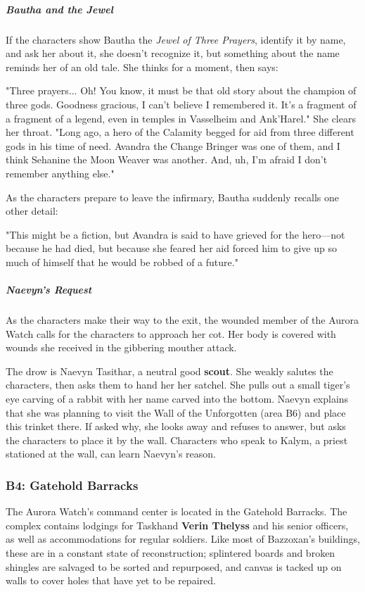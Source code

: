 \documentclass[10pt,a4paper,twoside,bg=print,twocolumn,openany,nodeprecatedcode]{dndbook}
\begin{document}
\subparagraph{Bautha and the Jewel}
If the characters show Bautha the \textit{Jewel of Three Prayers}, identify it by name, and ask her about it, she doesn't recognize it, but something about the name reminds her of an old tale. She thinks for a moment, then says:

\begin{DndReadAloud}{}
"Three prayers... Oh! You know, it must be that old story about the champion of three gods. Goodness gracious, I can't believe I remembered it. It's a fragment of a fragment of a legend, even in temples in Vasselheim and Ank'Harel." She clears her throat. "Long ago, a hero of the Calamity begged for aid from three different gods in his time of need. Avandra the Change Bringer was one of them, and I think Sehanine the Moon Weaver was another. And, uh, I'm afraid I don't remember anything else."

\end{DndReadAloud}

As the characters prepare to leave the infirmary, Bautha suddenly recalls one other detail:

\begin{DndReadAloud}{}
"This might be a fiction, but Avandra is said to have grieved for the hero—not because he had died, but because she feared her aid forced him to give up so much of himself that he would be robbed of a future."

\end{DndReadAloud}

\subparagraph{Naevyn's Request}
As the characters make their way to the exit, the wounded member of the Aurora Watch calls for the characters to approach her cot. Her body is covered with wounds she received in the gibbering mouther attack.

The drow is Naevyn Tasithar, a neutral good \textbf{scout}. She weakly salutes the characters, then asks them to hand her her satchel. She pulls out a small tiger's eye carving of a rabbit with her name carved into the bottom. Naevyn explains that she was planning to visit the Wall of the Unforgotten (area B6) and place this trinket there. If asked why, she looks away and refuses to answer, but asks the characters to place it by the wall. Characters who speak to Kalym, a priest stationed at the wall, can learn Naevyn's reason.

\subsubsection{B4: Gatehold Barracks}
The Aurora Watch's command center is located in the Gatehold Barracks. The complex contains lodgings for Taskhand \textbf{Verin Thelyss} and his senior officers, as well as accommodations for regular soldiers. Like most of Bazzoxan's buildings, these are in a constant state of reconstruction; splintered boards and broken shingles are salvaged to be sorted and repurposed, and canvas is tacked up on walls to cover holes that have yet to be repaired.
\end{document}
